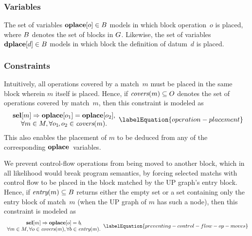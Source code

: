 \subsubsection{Variables}

The set of \glspl{variable} \mbox{$\mVar{oplace}[o] \in \mBlockSet$} models in
which \gls{block} \gls{operation}~$o$ is placed, where $B$ denotes the
set of \glspl{block} in $G$.
%
Likewise, the set of \glspl{variable} \mbox{$\mVar{dplace}[d] \in \mBlockSet$}
models in which \gls{block} the definition of \gls{datum}~$d$ is placed.


\subsubsection{Constraints}

Intuitively, all \glspl{operation} covered by a \gls{match}~$m$ must be placed
in the same \gls{block} wherein $m$ itself is placed.
%
Hence, if \mbox{$\operatorname{\textit{covers}}(m) \subseteq O$} denotes the set of
\glspl{operation} covered by \gls{match}~$m$, then this \gls{constraint} is
modeled as
%
\begin{equation}
  \begin{array}{c}
    \mVar{sel}[m] \mImp \mVar{oplace}[o_1] = \mVar{oplace}[o_2], \\
    \forall m \in \mMatchSet,
    \forall o_1\hspace{-1pt}, o_2 \in \mCovers(m).
  \end{array}
  \labelEquation{operation-placement}
\end{equation}
%
This also enables the placement of $m$ to be deduced from any of the
corresponding $\mVar{oplace}$~\glspl{variable}.

We prevent control-flow \glspl{operation} from being moved to another
\gls{block}, which in all likelihood would break \gls{program} semantics, by
forcing selected \glspl{match} with control flow to be placed in the \gls{block}
matched by the \gls{UP graph}'s \gls{entry block}.
%
Hence, if \mbox{$\operatorname{\textit{entry}}(m) \subseteq B$} returns either the empty set
or a set containing only the \gls{entry block} of match~$m$ (when the \gls{UP
  graph} of $m$ has such a node), then this \gls{constraint} is modeled as
%
\begin{equation}
  \begin{array}{c}
    \mVar{sel}[m] \mImp \mVar{oplace}[o] = b\hspace{-1.2pt}, \\
    \forall m \in \mMatchSet,
    \forall o \in \mCovers(m),
    \forall b \in \mEntry(m).
  \end{array}
  \labelEquation{preventing-control-flow-op-moves}
\end{equation}

